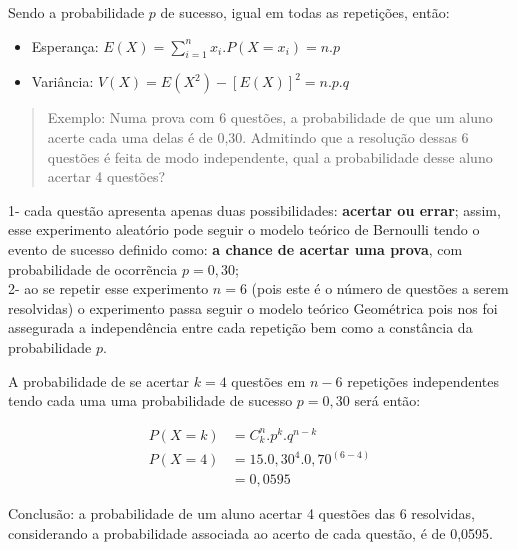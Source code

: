 \documentclass[
]{book}
\providecommand{\tightlist}{%
  \setlength{\itemsep}{0pt}\setlength{\parskip}{0pt}}
\begin{document}
\hfill\break

Sendo a probabilidade \(p\) de sucesso, igual em todas as repetições, então:

\hfill\break

\begin{itemize}
\tightlist
\item
  Esperança: \(E\left(X\right)=\sum _{i=1}^{n}{x}_{i}. P\left(X={x}_{i}\right)=n. p\)\\
\item
  Variância: \(V\left(X\right)=E\left({X}^{2}\right)-{\left[E\left(X\right)\right]}^{2} = n . p . q\)
\end{itemize}

\hfill\break

\begin{quote}
Exemplo: Numa prova com 6 questões, a probabilidade de que um aluno acerte cada uma delas é de 0,30. Admitindo que a resolução dessas 6 questões é feita de modo independente, qual a probabilidade desse aluno acertar 4 questões?
\end{quote}

\hfill\break

1- cada questão apresenta apenas duas possibilidades: \textbf{acertar ou errar}; assim, esse experimento aleatório pode seguir o modelo teórico de Bernoulli tendo o evento de sucesso definido como: \textbf{a chance de acertar uma prova}, com probabilidade de ocorrẽncia \(p=0,30\);\\
2- ao se repetir esse experimento \(n=6\) (pois este é o número de questões a serem resolvidas) o experimento passa seguir o modelo teórico Geométrica pois nos foi assegurada a independência entre cada repetição bem como a constância da probabilidade \(p\).

\hfill\break

A probabilidade de se acertar \(k=4\) questões em \(n-6\) repetições independentes tendo cada uma uma probabilidade de sucesso \(p=0,30\) será então:

\hfill\break

\begin{align*}
P\left(X=k\right) & = {C}_{k}^{n}. {p}^{k}. {q}^{n-k} \\
P\left(X=4\right) & = 15 . 0,30^{4} . 0,70^{(6-4)} \\
 & = 0,0595
\end{align*}

\hfill\break

Conclusão: a probabilidade de um aluno acertar 4 questões das 6 resolvidas, considerando a probabilidade associada ao acerto de cada questão, é de 0,0595.
\end{document}
